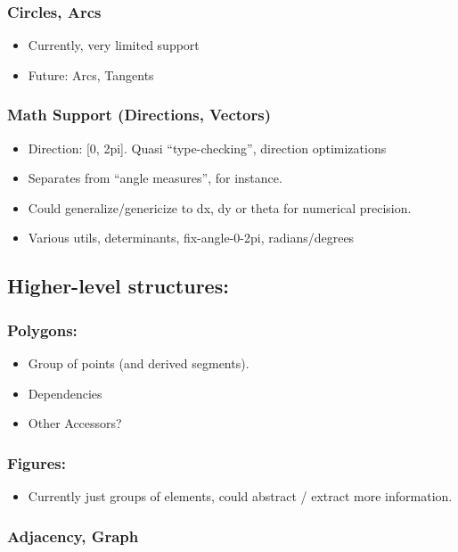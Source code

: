 \documentclass[11pt]{article}
\begin{document}
\subsubsection{Circles, Arcs}
\label{sec-3-1-4}

\begin{itemize}
\item Currently, very limited support
\item Future: Arcs, Tangents
\end{itemize}
\subsubsection{Math Support (Directions, Vectors)}
\label{sec-3-1-5}

\begin{itemize}
\item Direction: [0, 2pi]. Quasi ``type-checking'', direction
      optimizations
\item Separates from ``angle measures'', for instance.
\item Could generalize/genericize to dx, dy or theta for numerical precision.
\item Various utils, determinants, fix-angle-0-2pi, radians/degrees
\end{itemize}
\subsection{Higher-level structures:}
\label{sec-3-2}
\subsubsection{Polygons:}
\label{sec-3-2-1}

\begin{itemize}
\item Group of points (and derived segments).
\item Dependencies
\item Other Accessors?
\end{itemize}
\subsubsection{Figures:}
\label{sec-3-2-2}

\begin{itemize}
\item Currently just groups of elements, could abstract / extract
      more information.
\end{itemize}
\subsubsection{Adjacency, Graph}
\label{sec-3-2-3}
\end{document}
